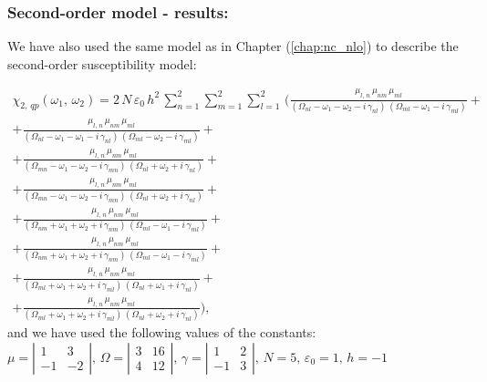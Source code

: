 \documentclass[12pt,twoside,a4paper]{article}
\numberwithin{equation}{subsection}
\numberwithin{figure}{subsection}
\begin{document}
\subsubsection*{Second-order model - results:}

We have also used the same model as in Chapter (\ref{chap:nc_nlo}) to describe the second-order susceptibility model:

\begin{multline} \label{eq:fht_qp2}
  \chi_{2, \,qp}({\omega_{1}}, \,{\omega_{2}}) = 
     2\,N\,\varepsilon_{0}\,h^{2}\,\sum_{n=1}^{2}\sum_{m=1}^{2}\sum_{l=1}^{2}\,
  ( 
      \frac {{\mu_{l,\,n}}\,{\mu_{nm}}\,{\mu_{ml}}}
      {({\Omega_{nl}} - \omega_1 - \omega_2 - i\,{\gamma_{nl}})\,({\Omega_{ml}} - \omega_1 - i\,{\gamma_{ml}})}
+\\ + \frac   {{\mu_{l, \,n}}\,{\mu_{nm}}\,{\mu_{ml}}}
      {({\Omega_{nl}} - \omega_1 - \omega_1 - i\,{\gamma_{nl}})\,({\Omega_{ml}} - \omega_2 - i\,{\gamma_{ml}})}
+\\ + \frac   {{\mu_{l, \,n}}\,{\mu_{nm}}\,{\mu_{ml}}}
      {({\Omega_{mn}} - \omega_1 - \omega_2 - i\,{\gamma_{mn}})\,({\Omega_{nl}} + \omega_2 + i\,{\gamma_{nl}})}
+\\ + \frac{{\mu_{l, \,n }}\,{\mu_{nm}}\,{\mu_{ml}}} 
      {({\Omega_{mn}} - \omega_1 - \omega_2 - i\,{\gamma_{mn}})\,({\Omega_{nl}} + \omega_2 + i\,{\gamma_{nl}})} 
+\\ + \frac   {{\mu_{l, \,n}}\,{\mu_{nm}}\,{\mu_{ml}}}
      {({\Omega_{nm}} + \omega_1 + \omega_2 + i\,{\gamma_{nm}})\,({\Omega_{ml}} - \omega_1 - i\,{\gamma_{ml}})}
+\\ + \frac {{\mu_{l, \,n}}\,{\mu_{ nm}}\,{\mu_{ml}}}
      {({\Omega_{nm}} + \omega_1 + \omega_2 + i\,{\gamma_{nm}})\,({\Omega_{ml}} - \omega_1 - i\,{\gamma_{ml}})} 
+\\ + \frac {{\mu_{l, \,n}}\,{\mu_{nm}}\,{\mu_{ml}}}
      {({\Omega_{ml}} + \omega_1 + \omega_2 + i\,{\gamma_{ml}})\,({\Omega_{nl}} + \omega_1 + i\,{\gamma_{nl}})}
+\\ + \frac {{\mu_{l, \,n}}\,{\mu_{nm}}\,{\mu_{ml}}}
      {({\Omega_{ml}} + \omega_1 + \omega_2 + i\,{\gamma_{ml}})\,({\Omega_{nl}} + \omega_2 + i\,{\gamma_{nl}})}
  )  ,
\end{multline}
and we have used the following values of the constants: \\
$\mu = \left| \begin{array}{cc} 
    1 & 3 \\ -1 & -2 
  \end{array} \right|,\, 
  \Omega = \left| \begin{array}{cc} 
    3 & 16 \\ 4 & 12 
  \end{array} \right|,\,
  \gamma = \left| \begin{array}{cc} 
  1 & 2 \\ -1 & 3
  \end{array} \right|,\, N=5,\, {\varepsilon_{0}}=1,\,h= - 1$
\end{document}
